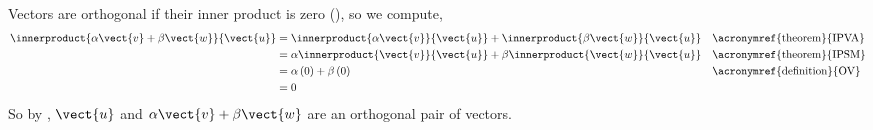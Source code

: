 Vectors are orthogonal if their inner product is zero (), so we compute,
%
\begin{align*}
\innerproduct{\alpha\vect{v}+\beta\vect{w}}{\vect{u}}
&=
\innerproduct{\alpha\vect{v}}{\vect{u}}+
\innerproduct{\beta\vect{w}}{\vect{u}}
&&\text{\acronymref{theorem}{IPVA}}\\
%
&=
\alpha\innerproduct{\vect{v}}{\vect{u}}+
\beta\innerproduct{\vect{w}}{\vect{u}}
&&\text{\acronymref{theorem}{IPSM}}\\
%
&=
\alpha\left(0\right)+\beta\left(0\right)
&&\text{\acronymref{definition}{OV}}\\
%
&=0
\end{align*}
%
So by , $\vect{u}$ and $\alpha\vect{v}+\beta\vect{w}$ are an orthogonal pair of vectors.